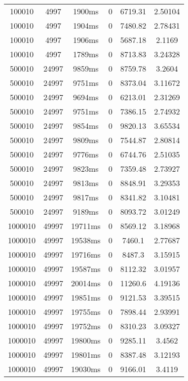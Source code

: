 \documentclass[./main.tex]{subfiles}
\begin{document}
\begin{table}
\begin{tabular}{ c | c | c | c | c | c }
        100010 & 4997 & 1900ms & 0 & 6719.31 & 2.50104 \\
        100010 & 4997 & 1904ms & 0 & 7480.82 & 2.78431 \\
        100010 & 4997 & 1906ms & 0 & 5687.18 & 2.1169 \\
        \rowcolor{lightgray} 100010 & 4997 & 1789ms & 0 & 8713.83 & 3.24328 \\
        \hline
        500010 & 24997 & 9859ms & 0 & 8759.78 & 3.2604 \\
        500010 & 24997 & 9751ms & 0 & 8373.04 & 3.11672 \\
        500010 & 24997 & 9694ms & 0 & 6213.01 & 2.31269 \\
        500010 & 24997 & 9751ms & 0 & 7386.15 & 2.74932 \\
        500010 & 24997 & 9854ms & 0 & 9820.13 & 3.65534 \\
        500010 & 24997 & 9809ms & 0 & 7544.87 & 2.80814 \\
        500010 & 24997 & 9776ms & 0 & 6744.76 & 2.51035 \\
        500010 & 24997 & 9823ms & 0 & 7359.48 & 2.73927 \\
        500010 & 24997 & 9813ms & 0 & 8848.91 & 3.29353 \\
        500010 & 24997 & 9817ms & 0 & 8341.82 & 3.10481 \\
        \rowcolor{lightgray} 500010 & 24997 & 9189ms & 0 & 8093.72 & 3.01249 \\
        \hline
        1000010 & 49997 & 19711ms & 0 & 8569.12 & 3.18968 \\
        1000010 & 49997 & 19538ms & 0 & 7460.1 & 2.77687 \\
        \rowcolor{lightgray} 1000010 & 49997 & 19716ms & 0 & 8487.3 & 3.15915 \\
        1000010 & 49997 & 19587ms & 0 & 8112.32 & 3.01957 \\
        1000010 & 49997 & 20014ms & 0 & 11260.6 & 4.19136 \\
        1000010 & 49997 & 19851ms & 0 & 9121.53 & 3.39515 \\
        1000010 & 49997 & 19755ms & 0 & 7898.44 & 2.93991 \\
        1000010 & 49997 & 19752ms & 0 & 8310.23 & 3.09327 \\
        1000010 & 49997 & 19800ms & 0 & 9285.11 & 3.4562 \\
        1000010 & 49997 & 19801ms & 0 & 8387.48 & 3.12193 \\
        1000010 & 49997 & 19030ms & 0 & 9166.01 & 3.4119 \\

\end{tabular}
\end{table}
\end{document}
